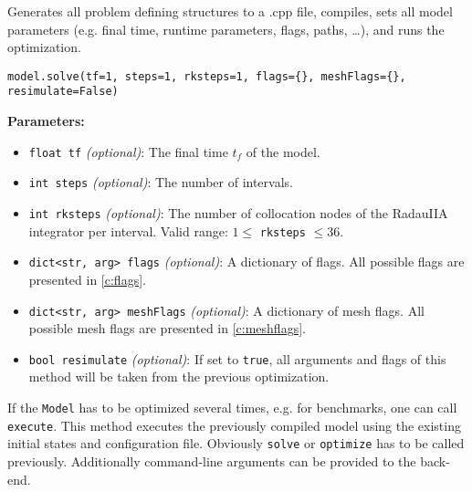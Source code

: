 \documentclass[12pt]{article}
\begin{document}
\begin{mdframed}[backgroundcolor=gray!10, roundcorner=10pt,
		linewidth=1pt]

	Generates all problem defining structures to a .cpp file, compiles,
	sets all model parameters (e.g. final time, runtime parameters, flags,
	paths, \ldots), and runs the optimization.

	\begin{lstlisting}
model.solve(tf=1, steps=1, rksteps=1, flags={}, meshFlags={}, resimulate=False)
	\end{lstlisting}
	\label{solve}
	\textbf{Parameters:}
	\begin{itemize}
		\item \texttt{float tf} \emph{(optional)}: The final time $t_f$
		      of the model.
		\item \texttt{int steps} \emph{(optional)}: The number of
		      intervals.
		\item \texttt{int rksteps} \emph{(optional)}: The number of
		      collocation nodes of the RadauIIA integrator per
		      interval. Valid range: $1
			      \leq$ \texttt{rksteps} $\leq 36$.
		\item \texttt{dict<str, arg> flags} \emph{(optional)}: A
		      dictionary of flags. All possible flags are presented in
		      \eqref{c:flags}.
		\item \texttt{dict<str, arg> meshFlags} \emph{(optional)}: A
		      dictionary of mesh flags. All possible mesh flags are
		      presented in
		      \eqref{c:meshflags}.
		\item \texttt{bool resimulate} \emph{(optional)}: If set to
		      \texttt{true}, all arguments and flags of this method
		      will be taken from the
		      previous optimization.
	\end{itemize}

\end{mdframed}

If the \texttt{Model} has to be optimized several times, e.g. for benchmarks, one can call \texttt{execute}. This method executes the previously compiled model using the existing initial states and configuration file. Obviously \texttt{solve} or \texttt{optimize} has to be called previously. Additionally command-line arguments can be provided to the back-end.
\end{document}
